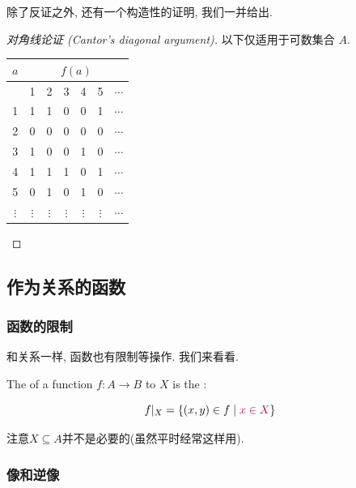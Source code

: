 除了反证之外, 还有一个构造性的证明, 我们一并给出. 

\begin{proof}[对角线论证 (Cantor's diagonal argument)]
以下仅适用于可数集合 $A$. 
  \begin{center}
    \begin{tabular}{|c||c|c|c|c|c|c|}
      \hline
      $a$      & \multicolumn{6}{c|}{$f(a)$} \\ \hline
            & 1      & 2      & 3      & 4      & 5      & $\cdots$ \\ \hline \hline
      1      & 1      & 1      & 0      & 0      & 1      & $\cdots$ \\ \hline
      2      & 0      & 0  & 0      & 0      & 0      & $\cdots$ \\ \hline
      3      & 1      & 0      & 0      & 1      & 0      & $\cdots$ \\ \hline
      4      & 1      & 1      & 1      & 0      & 1      & $\cdots$ \\ \hline
      5      & 0      & 1      & 0      & 1      & 0      & $\cdots$ \\ \hline
      $\vdots$ & $\vdots$ & $\vdots$ & $\vdots$ & $\vdots$ & $\vdots$ & $\cdots$ \\ \hline
    \end{tabular}
  \end{center}
\end{proof}

\subsection{作为关系的函数}

\subsubsection{函数的限制}
和关系一样, 函数也有限制等操作. 我们来看看. 

\begin{definition}[Restriction]
  The  of a function $f: A \to B$ to $X$
  is the :

  \[
    f|_{X} = \{(x, y) \in f \mid \textcolor{purple}{x \in X}\}
  \]
\end{definition}

注意$X \subseteq A$并不是必要的(虽然平时经常这样用). 

\subsubsection{像和逆像}

